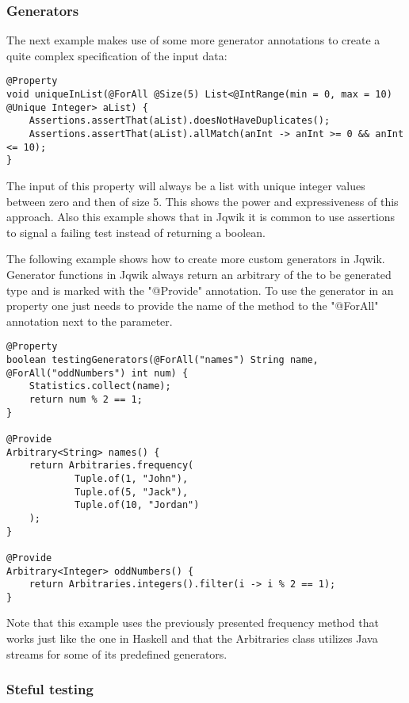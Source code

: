 \documentclass[a4paper, 12pt]{article} %
\begin{document}
\subsubsection{Generators}

The next example makes use of some more generator annotations to create a quite complex specification of the input data:

\begin{verbatim}
@Property
void uniqueInList(@ForAll @Size(5) List<@IntRange(min = 0, max = 10) @Unique Integer> aList) {
    Assertions.assertThat(aList).doesNotHaveDuplicates();
    Assertions.assertThat(aList).allMatch(anInt -> anInt >= 0 && anInt <= 10);
}
\end{verbatim} \cite{jqwikdoc}

The input of this property will always be a list with unique integer values between zero and then of size 5. This shows the power and expressiveness of this approach. Also this example shows that in Jqwik it is common to use assertions to signal a failing test instead of returning a boolean.

The following example shows how to create more custom generators in Jqwik. Generator functions in Jqwik always return an arbitrary of the to be generated type and is marked with the "@Provide" annotation. To use the generator in an property one just needs to provide the name of the method to the "@ForAll" annotation next to the parameter.

\begin{verbatim}
@Property
boolean testingGenerators(@ForAll("names") String name, @ForAll("oddNumbers") int num) {
    Statistics.collect(name);
    return num % 2 == 1;
}

@Provide
Arbitrary<String> names() {
    return Arbitraries.frequency(
            Tuple.of(1, "John"),
            Tuple.of(5, "Jack"),
            Tuple.of(10, "Jordan")
    );
}

@Provide
Arbitrary<Integer> oddNumbers() {
    return Arbitraries.integers().filter(i -> i % 2 == 1);
}
\end{verbatim} 

Note that this example uses the previously presented frequency method that works just like the one in Haskell and that the Arbitraries class utilizes Java streams for some of its predefined generators.

\subsubsection{Steful testing}
\end{document}

